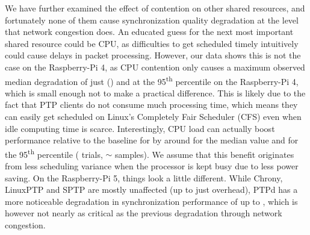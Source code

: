 We have  further examined the effect of contention on other shared resources, and fortunately none of them cause synchronization quality degradation at the level that network congestion does.
An educated guess for the next most important shared resource could be CPU, as difficulties to get scheduled timely intuitively could cause delays in packet processing.
However, our data shows this is not the case on the Raspberry-Pi 4, as CPU contention only causes a maximum observed median degradation of just \fRelative{\cmpMax} (\fVendor{\cmpMaxArg}) and \fRelative{\cmpMax} at the 95\textsuperscript{th} percentile on the Raspberry-Pi 4, which is small enough not to make a practical difference.
This is likely due to the fact that PTP clients do not consume much processing time, which means they can easily get scheduled on Linux's Completely Fair Scheduler (CFS) even when idle computing time is scarce.
Interestingly, CPU load can actually boost performance relative to the baseline for \fVendor{\cmpMinArg} by around \fRelativeInverted{\cmpMin} for the median value and \fRelativeInverted{\cmpMin} for the 95\textsuperscript{th} percentile ( trials, $\sim$ samples).
%
%
We assume that this benefit originates from less scheduling variance when the processor is kept busy due to less power saving.
%
%
On the Raspberry-Pi 5, things look a little different. While Chrony, LinuxPTP and SPTP are mostly unaffected (up to just \fRelative{\cmpMax} overhead),
%
%
PTPd has a more noticeable degradation in synchronization performance of up to \fRelative{\cmpMax}, which is however not nearly as critical as the previous degradation through network congestion.

%

